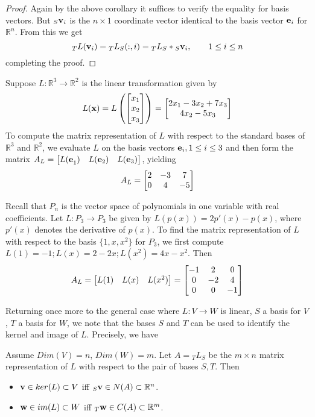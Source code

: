 \documentclass{ximera}
\begin{document}
\begin{proof} Again by the above corollary it suffices to verify the equality for basis vectors. But ${}_S{\bf v}_i$ is the $n\times 1$ coordinate vector identical to the basis vector ${\bf e}_i$ for $\mathbb R^n$. From this we get
\[
{}_TL({\bf v}_i) = {}_TL_S(:,i) = {}_TL_S*{}_S{\bf v}_i,\qquad 1\le i\le n
\]
completing the proof.
\end{proof}

\begin{example} Suppose $L:\mathbb R^3\to \mathbb R^2$ is the linear transformation given by
\[
L({\bf x}) = L\left(\bmatrix x_1\\x_2\\x_3\endbmatrix\right) = \bmatrix 2x_1 - 3x_2 + 7x_3\\ 4x_2 - 5x_3\endbmatrix
\]
To compute the matrix representation of $L$ with respect to the standard bases of $\mathbb R^3$ and $\mathbb R^2$, we evaluate $L$ on the basis vectors ${\bf e}_i, 1\le i\le 3$ and then form the matrix $A_L = \bmatrix {L(\bf e}_1) & L({\bf e}_2) & L({\bf e}_3)\endbmatrix$, yielding
\[
A_L = \bmatrix 2 & -3 & 7\\ 0 & 4 & -5 \endbmatrix
\]
\end{example}

\begin{example} Recall that $P_n$ is the vector space of polynomials in one variable with real coefficients. Let $L:P_3\to P_3$ be given by $L(p(x)) = 2p'(x) - p(x)$, where $p'(x)$ denotes the derivative of $p(x)$. To find the matrix representation of $L$ with respect to the basis $\{1,x,x^2\}$ for $P_3$, we first compute $L(1) = -1; L(x) = 2 - 2x; L(x^2) = 4x - x^2$. Then
\[
A_L = \bmatrix L(1) & L(x) & L(x^2)\endbmatrix = \bmatrix -1 & 2 & 0\\0 & -2 & 4\\0 & 0 & -1\endbmatrix
\]
\end{example}

Returning once more to the general case where $L:V\to W$ is linear, $S$ a basis for $V$, $T$ a basis for $W$, we note that the bases $S$ and $T$ can be used to identify the kernel and image of $L$. Precisely, we have

\begin{theorem} Assume $Dim(V) = n$, $Dim(W) = m$. Let $A = {}_{T}L_{S}$ be the $m\times n$ matrix representation of $L$ with respect to the pair of bases $S,T$. Then
\begin{itemize}
\item ${\bf v}\in ker(L)\subset V$ iff ${}_{S}{\bf v}\in N(A)\subset\mathbb R^n$.
\item ${\bf w}\in im(L)\subset W$ iff ${}_{T}{\bf w}\in C(A)\subset\mathbb R^m$.
\end{itemize}
\end{theorem}
\end{document}
